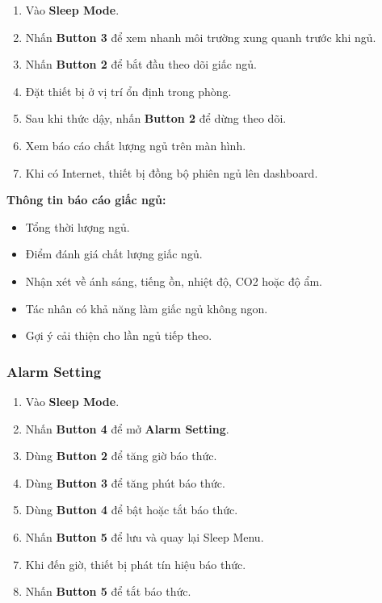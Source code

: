 \documentclass[12pt,a4paper]{article}
\begin{document}
\begin{enumerate}
    \item Vào \textbf{Sleep Mode}.
    \item Nhấn \textbf{Button 3} để xem nhanh môi trường xung quanh trước khi ngủ.
    \item Nhấn \textbf{Button 2} để bắt đầu theo dõi giấc ngủ.
    \item Đặt thiết bị ở vị trí ổn định trong phòng.
    \item Sau khi thức dậy, nhấn \textbf{Button 2} để dừng theo dõi.
    \item Xem báo cáo chất lượng ngủ trên màn hình.
    \item Khi có Internet, thiết bị đồng bộ phiên ngủ lên dashboard.
\end{enumerate}

\textbf{Thông tin báo cáo giấc ngủ:}

\begin{itemize}
    \item Tổng thời lượng ngủ.
    \item Điểm đánh giá chất lượng giấc ngủ.
    \item Nhận xét về ánh sáng, tiếng ồn, nhiệt độ, CO2 hoặc độ ẩm.
    \item Tác nhân có khả năng làm giấc ngủ không ngon.
    \item Gợi ý cải thiện cho lần ngủ tiếp theo.
\end{itemize}

\subsubsection{Alarm Setting}

\begin{enumerate}
    \item Vào \textbf{Sleep Mode}.
    \item Nhấn \textbf{Button 4} để mở \textbf{Alarm Setting}.
    \item Dùng \textbf{Button 2} để tăng giờ báo thức.
    \item Dùng \textbf{Button 3} để tăng phút báo thức.
    \item Dùng \textbf{Button 4} để bật hoặc tắt báo thức.
    \item Nhấn \textbf{Button 5} để lưu và quay lại Sleep Menu.
    \item Khi đến giờ, thiết bị phát tín hiệu báo thức.
    \item Nhấn \textbf{Button 5} để tắt báo thức.
\end{enumerate}
\end{document}
